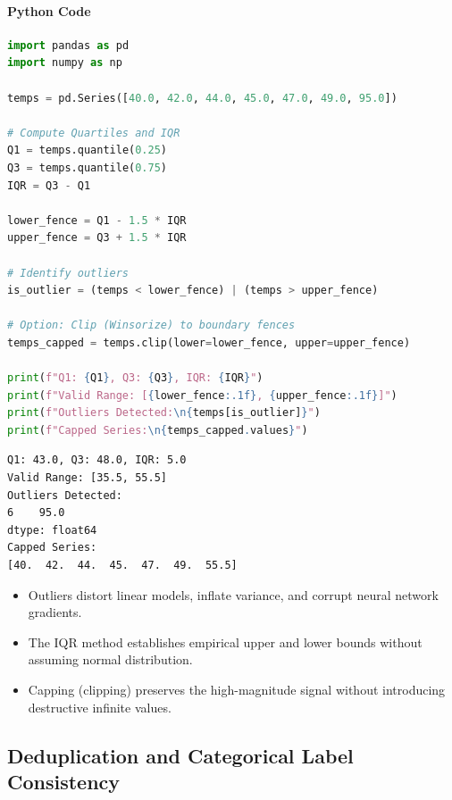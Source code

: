 \paragraph{Python Code}
\begin{lstlisting}[language=Python]
import pandas as pd
import numpy as np

temps = pd.Series([40.0, 42.0, 44.0, 45.0, 47.0, 49.0, 95.0])

# Compute Quartiles and IQR
Q1 = temps.quantile(0.25)
Q3 = temps.quantile(0.75)
IQR = Q3 - Q1

lower_fence = Q1 - 1.5 * IQR
upper_fence = Q3 + 1.5 * IQR

# Identify outliers
is_outlier = (temps < lower_fence) | (temps > upper_fence)

# Option: Clip (Winsorize) to boundary fences
temps_capped = temps.clip(lower=lower_fence, upper=upper_fence)

print(f"Q1: {Q1}, Q3: {Q3}, IQR: {IQR}")
print(f"Valid Range: [{lower_fence:.1f}, {upper_fence:.1f}]")
print(f"Outliers Detected:\n{temps[is_outlier]}")
print(f"Capped Series:\n{temps_capped.values}")
\end{lstlisting}

\begin{lstlisting}[style=outputstyle]
Q1: 43.0, Q3: 48.0, IQR: 5.0
Valid Range: [35.5, 55.5]
Outliers Detected:
6    95.0
dtype: float64
Capped Series:
[40.  42.  44.  45.  47.  49.  55.5]
\end{lstlisting}

\begin{takeaways}
\begin{itemize}
    \item Outliers distort linear models, inflate variance, and corrupt neural network gradients.
    \item The IQR method establishes empirical upper and lower bounds without assuming normal distribution.
    \item Capping (clipping) preserves the high-magnitude signal without introducing destructive infinite values.
\end{itemize}
\end{takeaways}

\subsection{Deduplication and Categorical Label Consistency}

